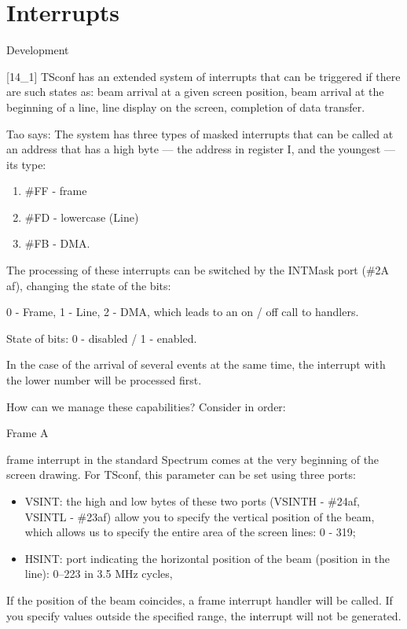 \chapter{Interrupts}
Development

[14\_1] TSconf has an extended system of interrupts that can be
triggered if there are such states as: beam arrival at a given screen
position, beam arrival at the beginning of a line, line display on the
screen, completion of data transfer.

Tao says: The system has three types of masked interrupts that can be
called at an address that has a high byte — the address in register I,
and the youngest — its type:
\begin{enumerate}
\item \#FF - frame
\item \#FD - lowercase (Line)
\item \#FB - DMA.
\end{enumerate}
The processing of these interrupts can be switched by the INTMask port
(\#2A af), changing the state of the bits:

0 - Frame, 1 - Line, 2 - DMA, which leads to an on / off call to
handlers.

State of bits: 0 - disabled / 1 - enabled.

In the case of the arrival of several events at the same time, the
interrupt with the lower number will be processed first.

How can we manage these capabilities? Consider in order:

Frame A

frame interrupt in the standard Spectrum comes at the very beginning
of the screen drawing. For TSconf, this parameter can be set using
three ports:
\begin{itemize}
\item VSINT: the high and low bytes of these two ports (VSINTH -
  \#24af, VSINTL - \#23af) allow you to specify the vertical position
  of the beam, which allows us to specify the entire area of the
  screen lines: 0 - 319;
\item HSINT: port indicating the horizontal position of the beam
  (position in the line): 0–223 in 3.5 MHz cycles,
\end{itemize}
If the position of the beam coincides, a frame interrupt handler will
be called. If you specify values outside the specified range, the
interrupt will not be generated.

